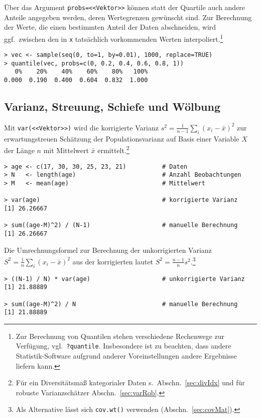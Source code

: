 Über das Argument \lstinline!probs=<<Vektor>>! können statt der Quartile auch andere Anteile angegeben werden, deren Wertegrenzen gewünscht sind. Zur Berechnung der Werte, die einen bestimmten Anteil der Daten abschneiden, wird ggf.\ zwischen den in \lstinline!x! tatsächlich vorkommenden Werten interpoliert.\footnote{\label{ftn:quantile}Zur Berechnung von Quantilen stehen verschiedene Rechenwege zur Verfügung, vgl.\ \lstinline!?quantile!. Insbesondere ist zu beachten, dass andere Statistik-Software aufgrund anderer Voreinstellungen andere Ergebnisse liefern kann.}
\begin{lstlisting}
> vec <- sample(seq(0, to=1, by=0.01), 1000, replace=TRUE)
> quantile(vec, probs=c(0, 0.2, 0.4, 0.6, 0.8, 1))
   0%    20%    40%    60%    80%   100%
0.000  0.190  0.400  0.604  0.832  1.000
\end{lstlisting}

\subsection{Varianz, Streuung, Schiefe und Wölbung}
\label{sec:varSd}

Mit \lstinline!var(<<Vektor>>)! wird die korrigierte Varianz $s^{2} = \frac{1}{n-1} \sum_{i}{(x_{i}-\bar{x})^{2}}$ zur erwartungstreuen Schätzung der Populationsvarianz auf Basis einer Variable $X$ der Länge $n$ mit Mittelwert $\bar{x}$ ermittelt.\footnote{Für ein Diversitätsmaß kategorialer Daten s.\ Abschn.\ \ref{sec:divIdx} und für robuste Varianzschätzer Abschn.\ \ref{sec:varRob}.}
\begin{lstlisting}
> age <- c(17, 30, 30, 25, 23, 21)          # Daten
> N   <- length(age)                        # Anzahl Beobachtungen
> M   <- mean(age)                          # Mittelwert

> var(age)                                  # korrigierte Varianz
[1] 26.26667

> sum((age-M)^2) / (N-1)                    # manuelle Berechnung
[1] 26.26667
\end{lstlisting}

Die Umrechnungsformel zur Berechnung der unkorrigierten Varianz $S^{2} = \frac{1}{n} \sum_{i}{(x_{i}-\bar{x})^{2}}$ aus der korrigierten lautet $S^{2} = \frac{n-1}{n} s^{2}$.\footnote{\label{ftn:covWT}Als Alternative lässt sich \lstinline!cov.wt()! verwenden (Abschn.\ \ref{sec:covMat}).}
\begin{lstlisting}
> ((N-1) / N) * var(age)                    # unkorrigierte Varianz
[1] 21.88889

> sum((age-M)^2) / N                        # manuelle Berechnung
[1] 21.88889
\end{lstlisting}

